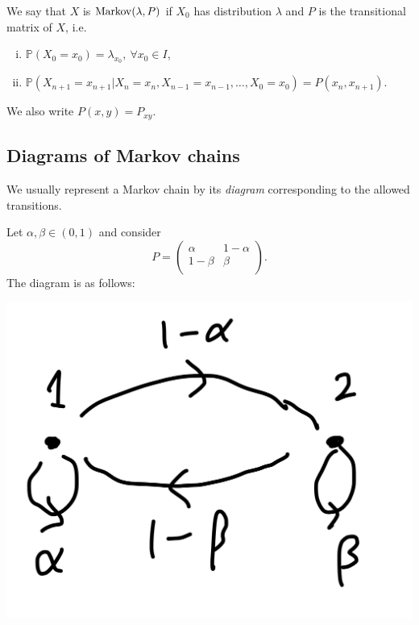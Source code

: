 \documentclass[a4paper]{article}
\begin{document}
\begin{definition}
    We say that $X$ is $ \operatorname{Markov}(\lambda,P) $ if $ X_0 $ has distribution $\lambda$ and $ P $ is the transitional matrix of $X$, i.e. 
    \begin{enumerate}[(i)]
        \item $ \mathbb{P}(X_0=x_0)=\lambda_{x_0},\ \forall x_0\in I $,
        \item $ \mathbb{P}(X_{n+1}=x_{n+1}|X_n=x_n, X_{n-1}=x_{n-1}, \dots, X_0=x_0) = P(x_{n},x_{n+1}) $.
    \end{enumerate}
\end{definition}
\begin{note}
    We also write $ P(x,y)=P_{xy} $.
\end{note}

\subsection{Diagrams of Markov chains}
We usually represent a Markov chain by its \textit{diagram} corresponding to the allowed transitions.
\begin{example}
    Let $ \alpha,\beta\in (0,1) $ and consider 
    \[
        P = \begin{pmatrix}
            \alpha & 1-\alpha \\
            1-\beta & \beta \\
        \end{pmatrix}.
    \]
    The diagram is as follows:
    \begin{center}
        \includegraphics[scale=0.07]{markov1.jpeg}
    \end{center}
\end{example}
\end{document}
